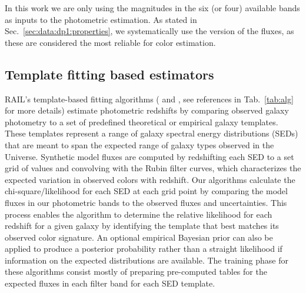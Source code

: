In this work we are only using the magnitudes in the six (or four) available bands as inputs to the photometric estimation.  As stated in
Sec.~\ref{sec:data:dp1:properties}, we systematically use the  version of the fluxes, as these are considered the most reliable for color estimation.


\subsection{Template fitting based estimators}
\label{sec:method:template}

RAIL’s template-based fitting algorithms ( and , see references in Tab.~\ref{tab:alg} for more details) estimate photometric redshifts by comparing observed galaxy photometry to a set of predefined theoretical or empirical galaxy templates.  These templates represent a range of galaxy spectral energy distributions (SEDs) that are meant to span the expected range of galaxy types observed in the Universe.  Synthetic model fluxes are computed by redshifting each SED to a set grid of values and convolving with the Rubin filter curves,  which characterizes the expected variation in observed colors with redshift.  Our algorithms calculate the chi-square/likelihood for each SED at each grid point by comparing the model fluxes in our photometric bands to the observed fluxes and uncertainties.  This process enables the algorithm to determine the relative likelihood for each redshift for a given galaxy by identifying the template that best matches its observed color signature.  An optional empirical Bayesian prior can also be applied to produce a posterior probability rather than a straight likelihood if information on the expected distributions are available.  The training phase for these algorithms consist mostly of preparing pre-computed tables for the expected fluxes in each filter band for each SED template. 


